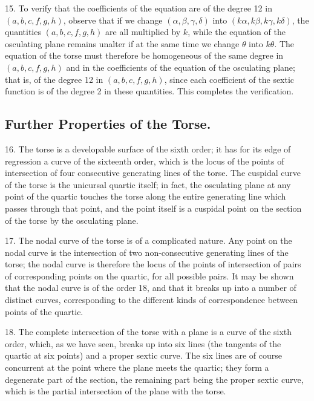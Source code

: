 \documentclass[11pt,a4paper]{article}
\begin{document}
15. To verify that the coefficients of the equation are of the degree 12 in $(a, b, c, f, g, h)$, observe that if we change $(\alpha, \beta, \gamma, \delta)$ into $(k\alpha, k\beta, k\gamma, k\delta)$, the quantities $(a, b, c, f, g, h)$ are all multiplied by $k$, while the equation of the osculating plane remains unalter if at the same time we change $\theta$ into $k\theta$. The equation of the torse must therefore be homogeneous of the same degree in $(a, b, c, f, g, h)$ and in the coefficients of the equation of the osculating plane; that is, of the degree 12 in $(a, b, c, f, g, h)$, since each coefficient of the sextic function is of the degree 2 in these quantities. This completes the verification.

\subsection*{Further Properties of the Torse.}

16. The torse is a developable surface of the sixth order; it has for its edge of regression a curve of the sixteenth order, which is the locus of the points of intersection of four consecutive generating lines of the torse. The cuspidal curve of the torse is the unicursal quartic itself; in fact, the osculating plane at any point of the quartic touches the torse along the entire generating line which passes through that point, and the point itself is a cuspidal point on the section of the torse by the osculating plane.

17. The nodal curve of the torse is of a complicated nature. Any point on the nodal curve is the intersection of two non-consecutive generating lines of the torse; the nodal curve is therefore the locus of the points of intersection of pairs of corresponding points on the quartic, for all possible pairs. It may be shown that the nodal curve is of the order 18, and that it breaks up into a number of distinct curves, corresponding to the different kinds of correspondence between points of the quartic.

18. The complete intersection of the torse with a plane is a curve of the sixth order, which, as we have seen, breaks up into six lines (the tangents of the quartic at six points) and a proper sextic curve. The six lines are of course concurrent at the point where the plane meets the quartic; they form a degenerate part of the section, the remaining part being the proper sextic curve, which is the partial intersection of the plane with the torse.
\end{document}

